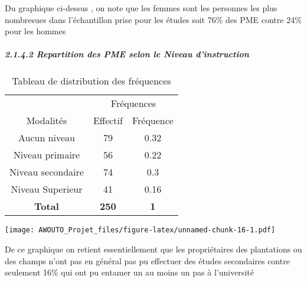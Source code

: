 \documentclass[
]{article}
\newenvironment{Shaded}{\begin{snugshade}}{\end{snugshade}}
\newcommand{\AttributeTok}[1]{\textcolor[rgb]{0.13,0.29,0.53}{#1}}
\newcommand{\FunctionTok}[1]{\textcolor[rgb]{0.13,0.29,0.53}{\textbf{#1}}}
\newcommand{\NormalTok}[1]{#1}
\newcommand{\SpecialCharTok}[1]{\textcolor[rgb]{0.81,0.36,0.00}{\textbf{#1}}}
\newcommand{\StringTok}[1]{\textcolor[rgb]{0.31,0.60,0.02}{#1}}
\begin{document}
Du graphique ci-dessus , on note que les femmes sont les personnes les
plus nombresues dans l'échantillon prise pour les études soit 76\% des
PME contre 24\% pour les hommes

\hypertarget{repartition-des-pme-selon-le-niveau-dinstruction}{%
\subparagraph{2.1.4.2 Repartition des PME selon le Niveau
d'instruction}\label{repartition-des-pme-selon-le-niveau-dinstruction}}

\begin{Shaded}
\end{Shaded}

\begin{longtable}[t]{ccc}
\caption{\label{tab:unnamed-chunk-16}Tableau de distribution des fréquences}\\
\toprule
\multicolumn{1}{c}{ } & \multicolumn{2}{c}{Fréquences} \\
\cmidrule(l{3pt}r{3pt}){2-3}
Modalités & Effectif & Fréquence\\
\midrule
Aucun niveau & 79 & 0.32\\
Niveau primaire & 56 & 0.22\\
Niveau secondaire & 74 & 0.3\\
Niveau Superieur & 41 & 0.16\\
\textbf{Total} & \textbf{250} & \textbf{1}\\
\bottomrule
\end{longtable}

\begin{Shaded}
\end{Shaded}

\texttt{[image: AWOUTO\_Projet\_files/figure-latex/unnamed-chunk-16-1.pdf]}

De ce graphique on retient essentiellement que les propriétaires des
plantations ou des champs n'ont pas en général pas pu effectuer des
études secondaires contre seulement 16\% qui ont pu entamer un au moins
un pas à l'université
\end{document}

